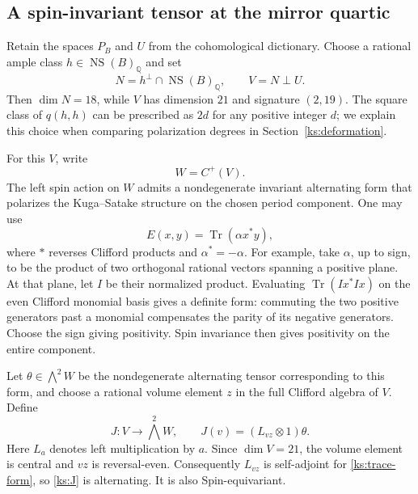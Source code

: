 \documentclass[11pt]{article}
\numberwithin{equation}{section}
\theoremstyle{definition}
\theoremstyle{remark}
\begin{document}
\subsection{A spin-invariant tensor at the mirror quartic}
\label{ks:construction}

Retain the spaces $P_B$ and $U$ from the cohomological dictionary.
Choose a rational ample class $h\in\operatorname{NS}(B)_{\mathbb Q}$ and set
\[
 N=h^\perp\cap\operatorname{NS}(B)_{\mathbb Q},\qquad V=N\perp U.
\]
Then $\dim N=18$, while $V$ has dimension $21$ and signature
$(2,19)$.  The square class of $q(h,h)$ can be prescribed as
$2d$ for any positive integer $d$; we explain this choice when
comparing polarization degrees in Section~\ref{ks:deformation}.

For this $V$, write
\[
 W=C^+(V).
\]
The left spin action on $W$ admits a nondegenerate invariant
alternating form that polarizes the Kuga--Satake structure on
the chosen period component.  One may use
\begin{equation}
 \label{ks:trace-form}
 E(x,y)=\operatorname{Tr}(\alpha x^*y),
\end{equation}
where $*$ reverses Clifford products and $\alpha^*=-\alpha$.
For example, take $\alpha$, up to sign, to be the product of
two orthogonal rational vectors spanning a positive plane.
At that plane, let $I$ be their normalized product.  Evaluating
$\operatorname{Tr}(I x^* I x)$ on the even Clifford monomial
basis gives a definite form: commuting the two positive
generators past a monomial compensates the parity of its
negative generators.  Choose the sign giving positivity.
Spin invariance then gives positivity on the entire component.

Let $\theta\in\bigwedge^2W$ be the nondegenerate alternating
tensor corresponding to this form, and choose a rational volume
element $z$ in the full Clifford algebra of $V$.  Define
\begin{equation}
 \label{ks:J}
 J:V\longrightarrow\bigwedge^2W,
 \qquad J(v)=(L_{vz}\otimes1)\theta.
\end{equation}
Here $L_a$ denotes left multiplication by $a$.  Since $\dim V=21$,
the volume element is central and $vz$ is reversal-even.
Consequently $L_{vz}$ is self-adjoint for \eqref{ks:trace-form},
so \eqref{ks:J} is alternating.  It is also Spin-equivariant.
\end{document}
